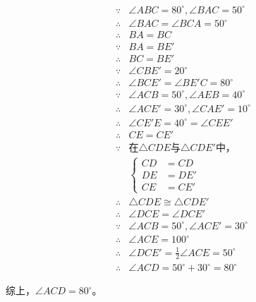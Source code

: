 \begin{align*}
  \because  {}& \angle ABC = 80^\circ, \angle BAC = 50^\circ \\
  \therefore{}& \angle BAC = \angle BCA = 50^\circ \\
  \therefore{}& BA = BC \\
  \because  {}& BA = BE' \\
  \therefore{}& BC = BE' \\
  \because  {}& \angle CBE' = 20^\circ \\
  \therefore{}& \angle BCE' = \angle BE'C = 80^\circ \\
  \because  {}& \angle ACB = 50^\circ, \angle AEB = 40^\circ \\
  \therefore{}& \angle ACE' = 30^\circ, \angle CAE' = 10^\circ \\
  \therefore{}& \angle CE'E = 40^\circ = \angle CEE' \\
  \therefore{}& CE = CE' \\
  \because  {}& \text{在$\triangle CDE$与$\triangle CDE'$中，} \\
  & \left\{ \begin{aligned}
    CD &= CD \\ DE &= DE' \\ CE &= CE'
  \end{aligned} \right. \\
  \therefore{}& \triangle CDE \cong \triangle CDE' \\
  \therefore{}& \angle DCE = \angle DCE' \\
  \because  {}& \angle ACB = 50^\circ, \angle ACE' = 30^\circ \\
  \therefore{}& \angle ACE = 100^\circ \\
  \therefore{}& \angle DCE' = \frac12\angle ACE = 50^\circ \\
  \therefore{}& \angle ACD = 50^\circ + 30^\circ = 80^\circ
\end{align*}

综上，$\angle ACD = 80^\circ$。
